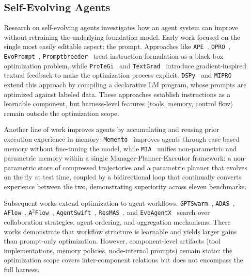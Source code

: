 \subsection{Self-Evolving Agents}
\label{sec:related-self-evolving}

Research on self-evolving agents investigates how an agent system can improve without retraining the underlying foundation model. Early work focused on the single most easily editable aspect: the prompt. Approaches like \texttt{APE}~\cite{zhou2022large}, \texttt{OPRO}~\cite{yang2024large}, \texttt{EvoPrompt}~\cite{guo2024connecting}, \texttt{Promptbreeder}~\cite{fernando2024promptbreeder} treat instruction formulation as a black-box optimization problem, while \texttt{ProTeGi}~\cite{pryzant2023automatic} and \texttt{TextGrad}~\cite{yuksekgonul2024textgrad} introduce gradient-inspired textual feedback to make the optimization process explicit. \texttt{DSPy}~\cite{khattab2023dspy} and \texttt{MIPRO}~\cite{opsahl2024optimizing} extend this approach by compiling a declarative LM program, whose prompts are optimized against labeled data. These approaches establish instructions as a learnable component, but harness-level features (tools, memory, control flow) remain outside the optimization scope.

Another line of work improves agents by accumulating and reusing prior execution experience in memory: \texttt{Memento}~\cite{zhou2025memento} improves agents through case-based memory without fine-tuning the model, while \texttt{MIA}~\cite{qiao2026memory} unifies non-parametric and parametric memory within a single Manager-Planner-Executor framework: a non-parametric store of compressed trajectories and a parametric planner that evolves on the fly at test time, coupled by a bidirectional loop that continually converts experience between the two, demonstrating superiority across eleven benchmarks.

Subsequent works extend optimization to agent workflows. \texttt{GPTSwarm}~\cite{zhuge2024gptswarm}, \texttt{ADAS}~\cite{hu2025automated}, \texttt{AFlow}~\cite{zhang2025aflow}, \texttt{A$^2$Flow}~\cite{zhao2026a2flow}, \texttt{AgentSwift}~\cite{li2026agentswift}, \texttt{ResMAS}~\cite{zhou2026resmas}, and \texttt{EvoAgentX}~\cite{wang2025evoagentx} search over collaboration strategies, agent ordering, and aggregation mechanisms. These works demonstrate that workflow structure is learnable and yields larger gains than prompt-only optimization. However, component-level artifacts (tool implementations, memory policies, node-internal prompts) remain static: the optimization scope covers inter-component relations but does not encompass the full harness.

